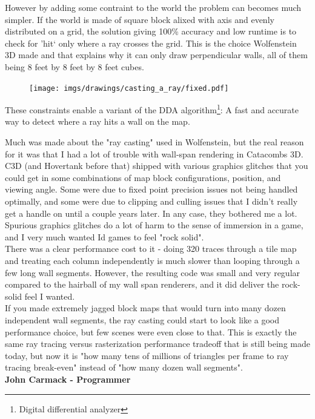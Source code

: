 However by adding some contraint to the world the problem can becomes much simpler. If the world is made of square block alixed with axis and evenly distributed on a grid, the solution giving 100\% accuracy and low runtime is to check for 'hit` only where a ray crosses the grid. This is the choice Wolfenstein 3D made and that explains why it can only draw perpendicular walls, all of them being 8 feet by 8 feet by 8 feet cubes.
\begin{figure}[H]
\centering
\texttt{[image: imgs/drawings/casting\_a\_ray/fixed.pdf]}
 
\end{figure}
\par
These constraints enable a variant of the DDA algorithm\footnote{Digital differential analyzer}: A fast and accurate way to detect where a ray hits a wall on the map.
\par
\begin{fancyquotes}
\par
Much was made about the "ray casting" used in Wolfenstein, but the real reason for it was that I had a lot of trouble with wall-span rendering in Catacombs 3D.  C3D (and Hovertank before that) shipped with various graphics glitches that you could get in some combinations of map block configurations, position, and viewing angle.  Some were due to fixed point precision issues not being handled optimally, and some were due to clipping and culling issues that I didn't really get a handle on until a couple years later.  In any case, they bothered me a lot.  Spurious graphics glitches do a lot of harm to the sense of immersion in a game, and I very much wanted Id games to feel "rock solid".
 \bigskip \\
There was a clear performance cost to it - doing 320 traces through a tile map and treating each column independently is much slower than looping through a few long wall segments.  However, the resulting code was small and very regular compared to the hairball of my wall span renderers, and it did deliver the rock-solid feel I wanted.
 \bigskip \\
If you made extremely jagged block maps that would turn into many dozen independent wall segments, the ray casting could start to look like a good performance choice, but few scenes were even close to that.  This is exactly the same ray tracing versus rasterization performance tradeoff that is still being made today, but now it is "how many tens of millions of triangles per frame to ray tracing break-even" instead of "how many dozen wall segments".
 \bigskip \\
\textbf{John Carmack - Programmer}
 \end{fancyquotes}



